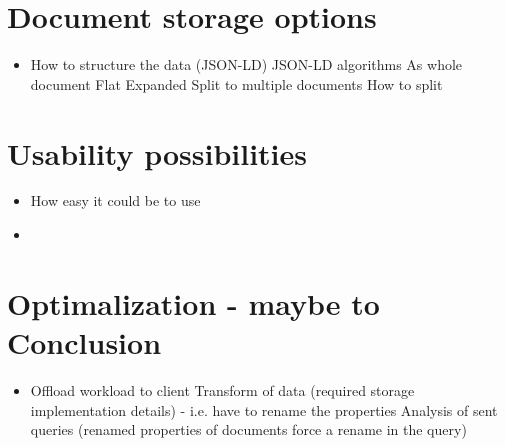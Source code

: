 \section{Document storage options}
\begin{itemize}
	\item How to structure the data (JSON-LD)
		\subitem JSON-LD algorithms
		\subitem As whole document
			\subsubitem Flat
			\subsubitem Expanded
		\subitem Split to multiple documents
			\subsubitem How to split
\end{itemize}

\section{Usability possibilities}
\begin{itemize}
	\item How easy it could be to use
	\item 
\end{itemize}

\section{Optimalization - maybe to Conclusion}
\begin{itemize}
	\item Offload workload to client
		\subitem Transform of data (required storage implementation details) - i.e. have to rename the properties
		\subitem Analysis of sent queries (renamed properties of documents force a rename in the query)
\end{itemize}






